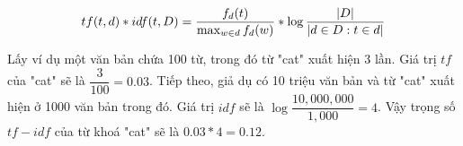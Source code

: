 \begin{equation}
tf(t, d) * idf(t, D) = \dfrac{f_d(t)}{\max_{w \in d} f_d(w)} * \log{\dfrac{|D|}{|d \in D : t \in d|}}\\\\\\
\end{equation}

Lấy ví dụ một văn bản chứa 100 từ, trong đó từ "cat" xuất hiện 3 lần. Giá trị $tf$ của "cat" sẽ là   $\dfrac{3}{100} = 0.03$. Tiếp theo, giả dụ có 10 triệu văn bản và từ "cat" xuất hiện ở 1000 văn bản trong đó. Giá trị $idf$ sẽ là $\log{\dfrac{10,000,000}{1,000}} = 4$. Vậy trọng số $tf-idf$ của từ khoá "cat" sẽ là $0.03 * 4 = 0.12$.


